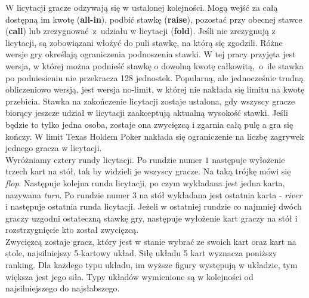 \documentclass[magisterska]{pracamgr}
\begin{document}
\noindent
W licytacji gracze odzywają się w ustalonej kolejności. Mogą wejść za całą dostępną im kwotę (\textbf{all-in}),
podbić stawkę (\textbf{raise}), pozostać przy
obecnej stawce (\textbf{call}) lub zrezygnować~z~udziału w licytacji (\textbf{fold}). Jeśli nie zrezygnują z licytacji,
są zobowiązani włożyć do puli stawkę, na którą się zgodzili. Różne wersje gry określają ograniczenia podnoszenia
stawki. W tej pracy przyjęta jest wersja, w której można podnieść stawkę o dowolną kwotę całkowitą,~o~ile stawka
po podniesieniu nie przekracza 128 jednostek. Popularną, ale jednocześnie trudną obliczeniowo wersją,
jest wersja no-limit, w której nie nakłada się limitu na kwotę przebicia.
Stawka na zakończenie licytacji zostaje ustalona, gdy
wszyscy gracze biorący jeszcze udział w licytacji zaakceptują aktualną wysokość stawki. Jeśli będzie to
tylko jedna osoba, zostaje ona zwycięzcą i zgarnia całą pulę a gra się kończy. W limit Texas Holdem Poker
nakłada się ograniczenie na liczbę zagrywek jednego gracza w licytacji.\\

\noindent
Wyróżniamy cztery rundy licytacji.
Po rundzie numer $1$ następuje wyłożenie trzech kart na stół, tak by widzieli je wszyscy gracze.
Na taką trójkę mówi się \emph{flop}. Następuje kolejna runda licytacji, po czym wykładana jest jedna karta, nazywana \emph{turn}.
Po rundzie numer $3$ na stół wykładana jest ostatnia karta - \emph{river} i następuje ostatnia runda
licytacji. Jeżeli w ostatniej rundzie co najmniej dwóch graczy uzgodni ostateczną stawkę gry, następuje
wyłożenie kart graczy na stół i rozstrzygnięcie kto został zwycięzcą. \\

\noindent
Zwycięzcą zostaje gracz, który jest w stanie wybrać ze swoich kart oraz kart na stole, najsilniejszy
5-kartowy układ. Siłę układu 5 kart wyznacza poniższy ranking. Dla każdego typu układu, im wyższe
figury występują w układzie, tym większa jest jego siła. Typy układów wymienione są w kolejności
od najsilniejszego do najsłabszego.
\end{document}
